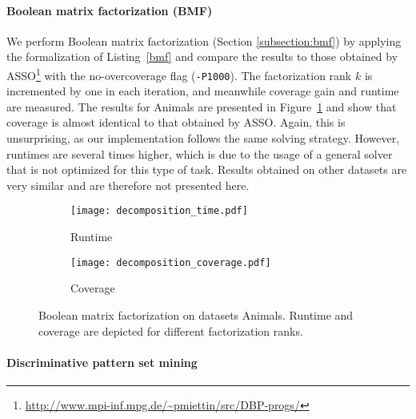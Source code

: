 \paragraph{Boolean matrix factorization (BMF)}
We perform Boolean matrix factorization (Section \ref{subsection:bmf}) by applying the formalization of Listing~\ref{bmf} and compare the results to those obtained by ASSO\footnote{\url{http://www.mpi-inf.mpg.de/~pmiettin/src/DBP-progs/}} \citep{conf/icdm/Miettinen12} with the no-overcoverage flag (\texttt{-P1000}). The factorization rank $k$ is incremented by one in each iteration, and meanwhile coverage gain and runtime are measured. The results for Animals are presented in Figure~\ref{figure:bmf} and show that coverage is almost identical to that obtained by ASSO. Again, this is unsurprising, as our implementation follows the same solving strategy.  However, runtimes are several times higher, which is due to the usage of a general solver that is not optimized for this type of task. Results obtained on other datasets are very similar and are therefore not presented here.

\begin{figure}
\begin{center}
\begin{subfigure}{.49\textwidth}
\centering
\captionsetup{skip=-3pt}
  \texttt{[image: decomposition\_time.pdf]}
\caption{Runtime}
\end{subfigure}
   \hfill 
\begin{subfigure}{.49\textwidth}
\centering
\captionsetup{skip=-3pt}
  \texttt{[image: decomposition\_coverage.pdf]}
\caption{Coverage}
\end{subfigure}
  \captionsetup{skip=2pt}
  \caption{Boolean matrix factorization on datasets Animals. Runtime and coverage are depicted for different factorization ranks.}
  \label{figure:bmf}
  \end{center}
  \end{figure}

\paragraph{Discriminative pattern set mining}

